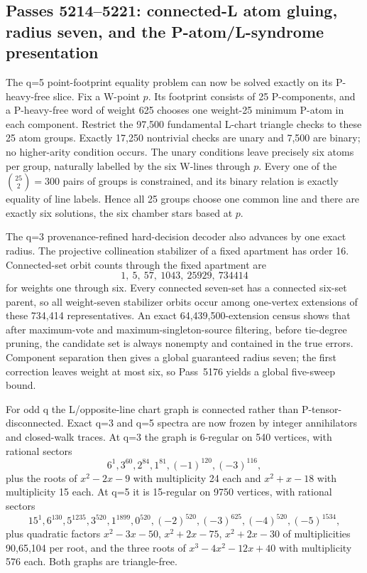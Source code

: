 \ifdefined\WPassFiveTwoOneFourLoaded\else
\gdef\WPassFiveTwoOneFourLoaded{1}
\subsection*{Passes 5214--5221: connected-L atom gluing, radius seven, and the P-atom/L-syndrome presentation}

The q=5 point-footprint equality problem can now be solved exactly on its P-heavy-free slice.  Fix a W-point $p$.  Its footprint consists of 25 P-components, and a P-heavy-free word of weight 625 chooses one weight-25 minimum P-atom in each component.  Restrict the 97,500 fundamental L-chart triangle checks to these 25 atom groups.  Exactly 17,250 nontrivial checks are unary and 7,500 are binary; no higher-arity condition occurs.  The unary conditions leave precisely six atoms per group, naturally labelled by the six W-lines through $p$.  Every one of the $\binom{25}{2}=300$ pairs of groups is constrained, and its binary relation is exactly equality of line labels.  Hence all 25 groups choose one common line and there are exactly six solutions, the six chamber stars based at $p$.

The q=3 provenance-refined hard-decision decoder also advances by one exact radius.  The projective collineation stabilizer of a fixed apartment has order 16.  Connected-set orbit counts through the fixed apartment are
\[
1,\ 5,\ 57,\ 1043,\ 25929,\ 734414
\]
for weights one through six.  Every connected seven-set has a connected six-set parent, so all weight-seven stabilizer orbits occur among one-vertex extensions of these 734,414 representatives.  An exact 64,439,500-extension census shows that after maximum-vote and maximum-singleton-source filtering, before tie-degree pruning, the candidate set is always nonempty and contained in the true errors.  Component separation then gives a global guaranteed radius seven; the first correction leaves weight at most six, so Pass~5176 yields a global five-sweep bound.

For odd q the L/opposite-line chart graph is connected rather than P-tensor-disconnected.  Exact q=3 and q=5 spectra are now frozen by integer annihilators and closed-walk traces.  At q=3 the graph is 6-regular on 540 vertices, with rational sectors
\[
6^1,3^{60},2^{84},1^{81},(-1)^{120},(-3)^{116},
\]
plus the roots of $x^2-2x-9$ with multiplicity 24 each and $x^2+x-18$ with multiplicity 15 each.  At q=5 it is 15-regular on 9750 vertices, with rational sectors
\[
15^1,6^{130},5^{1235},3^{520},1^{1899},0^{520},(-2)^{520},(-3)^{625},(-4)^{520},(-5)^{1534},
\]
plus quadratic factors $x^2-3x-50$, $x^2+2x-75$, $x^2+2x-30$ of multiplicities 90,65,104 per root, and the three roots of $x^3-4x^2-12x+40$ with multiplicity 576 each.  Both graphs are triangle-free.

